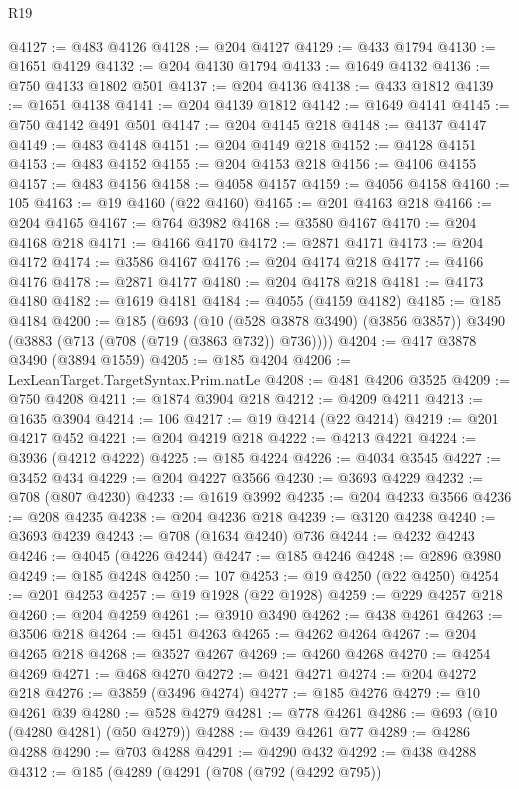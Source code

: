 \begin{lexlean}{R19}
\begin{coremodule}
{{{{{{{{{{{@4127 := @483 @4126
@4128 := @204 @4127
@4129 := @433 @1794
@4130 := @1651 @4129
@4132 := @204 @4130 @1794
@4133 := @1649 @4132
@4136 := @750 @4133 @1802 @501
@4137 := @204 @4136
@4138 := @433 @1812
@4139 := @1651 @4138
@4141 := @204 @4139 @1812
@4142 := @1649 @4141
@4145 := @750 @4142 @491 @501
@4147 := @204 @4145 @218
@4148 := @4137 @4147
@4149 := @483 @4148
@4151 := @204 @4149 @218
@4152 := @4128 @4151
@4153 := @483 @4152
@4155 := @204 @4153 @218
@4156 := @4106 @4155
@4157 := @483 @4156
@4158 := @4058 @4157
@4159 := @4056 @4158
@4160 := 105
@4163 := @19 @4160 (@22 @4160)
@4165 := @201 @4163 @218
@4166 := @204 @4165
@4167 := @764 @3982
@4168 := @3580 @4167
@4170 := @204 @4168 @218
@4171 := @4166 @4170
@4172 := @2871 @4171
@4173 := @204 @4172
@4174 := @3586 @4167
@4176 := @204 @4174 @218
@4177 := @4166 @4176
@4178 := @2871 @4177
@4180 := @204 @4178 @218
@4181 := @4173 @4180
@4182 := @1619 @4181
@4184 := @4055 (@4159 @4182)
@4185 := @185 @4184
@4200 := @185
    (@693
      (@10 (@528 @3878 @3490) (@3856 @3857))
      @3490
      (@3883 (@713 (@708 (@719 (@3863 @732)) @736))))
@4204 := @417 @3878 @3490 (@3894 @1559)
@4205 := @185 @4204
@4206 := LexLeanTarget.TargetSyntax.Prim.natLe
@4208 := @481 @4206 @3525
@4209 := @750 @4208
@4211 := @1874 @3904 @218
@4212 := @4209 @4211
@4213 := @1635 @3904
@4214 := 106
@4217 := @19 @4214 (@22 @4214)
@4219 := @201 @4217 @452
@4221 := @204 @4219 @218
@4222 := @4213 @4221
@4224 := @3936 (@4212 @4222)
@4225 := @185 @4224
@4226 := @4034 @3545
@4227 := @3452 @434
@4229 := @204 @4227 @3566
@4230 := @3693 @4229
@4232 := @708 (@807 @4230)
@4233 := @1619 @3992
@4235 := @204 @4233 @3566
@4236 := @208 @4235
@4238 := @204 @4236 @218
@4239 := @3120 @4238
@4240 := @3693 @4239
@4243 := @708 (@1634 @4240) @736
@4244 := @4232 @4243
@4246 := @4045 (@4226 @4244)
@4247 := @185 @4246
@4248 := @2896 @3980
@4249 := @185 @4248
@4250 := 107
@4253 := @19 @4250 (@22 @4250)
@4254 := @201 @4253
@4257 := @19 @1928 (@22 @1928)
@4259 := @229 @4257 @218
@4260 := @204 @4259
@4261 := @3910 @3490
@4262 := @438 @4261
@4263 := @3506 @218
@4264 := @451 @4263
@4265 := @4262 @4264
@4267 := @204 @4265 @218
@4268 := @3527 @4267
@4269 := @4260 @4268
@4270 := @4254 @4269
@4271 := @468 @4270
@4272 := @421 @4271
@4274 := @204 @4272 @218
@4276 := @3859 (@3496 @4274)
@4277 := @185 @4276
@4279 := @10 @4261 @39
@4280 := @528 @4279
@4281 := @778 @4261
@4286 := @693 (@10 (@4280 @4281) (@50 @4279))
@4288 := @439 @4261 @77
@4289 := @4286 @4288
@4290 := @703 @4288
@4291 := @4290 @432
@4292 := @438 @4288
@4312 := @185
    (@4289
      (@4291
        (@708
          (@792 (@4292 @795))
}}}}}}}}}}}
\end{coremodule}
\end{lexlean}
